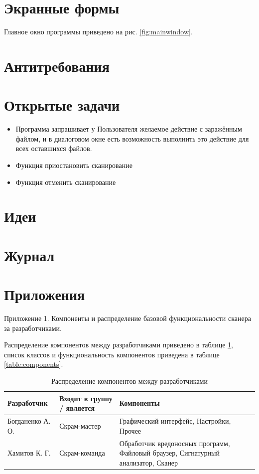 \section{Экранные формы}
Главное окно программы приведено на рис. \ref{fig:mainwindow}.
\section{Антитребования}
\section{Открытые задачи}
\begin{itemize}
\item Программа запрашивает у Пользователя желаемое действие с заражённым файлом, и в диалоговом окне есть возможность выполнить это действие для всех оставшихся файлов.
\item Функция приостановить сканирование
\item Функция отменить сканирование
\end{itemize}
\section{Идеи}
\section{Журнал}
\section{Приложения}
Приложение 1. Компоненты и распределение базовой функциональности сканера за разработчиками.

Распределение компонентов между разработчиками приведено в таблице \ref{table:responsibilities}, список классов и функциональность компонентов приведена в таблице \ref{table:components}.
\begin{table}[h]
\centering
\begin{tabular}{|l|p{3cm}|p{3cm}|}
\hline
Разработчик & Входит в группу / является & Компоненты \\
\hline
Богданенко А. О. & Скрам-мастер & Графический интерфейс, Настройки, Прочее \\
\hline
Хамитов К. Г. & Скрам-команда & Обработчик вредоносных программ, Файловый браузер, Сигнатурный анализатор, Сканер \\
\hline
\end{tabular}
\caption{Распределение компонентов между разработчиками}
\label{table:responsibilities}
\end{table}


